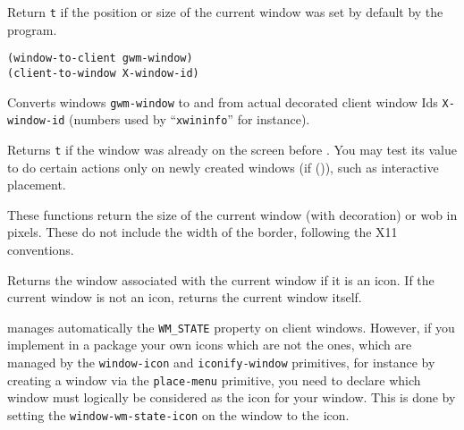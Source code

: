 
Return \verb"t" if the position or size of the current window was set
by default by the program.


{\usagefont\begin{verbatim}
(window-to-client gwm-window)
(client-to-window X-window-id)
\end{verbatim}}\usageupspace

Converts {\GWM} windows \verb|gwm-window| to and from actual decorated client
window Ids \verb|X-window-id| (numbers used by ``\verb|xwininfo|'' for
instance).

        

Returns \verb"t" if the window was already on the screen before {\GWM}.  You may test
its value to do certain actions only on newly created windows (if ()), such
as interactive placement.

        

These functions return the size of the current window (with decoration) or
wob in pixels.  These do not include the width of the border, following the
X11 conventions.

        

Returns the window associated with the current window if it is an icon. If
the current window is not an icon, returns the current window itself.


        

{\GWM} manages automatically the \verb"WM_STATE" property on client windows.
However, if you implement in a {\WOOL} package your own icons which are not
the {\GWM} ones, which are managed by the 
\verb"window-icon" and \verb"iconify-window"
primitives, for instance by creating a window via the \verb"place-menu"
primitive, you need to declare which window must logically be
considered as the icon for your window. This is done by setting the
\verb"window-wm-state-icon" on the window to the icon.

